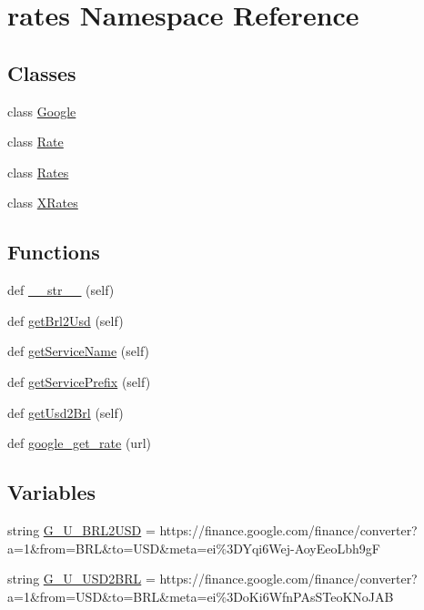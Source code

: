 \hypertarget{namespacerates}{}\section{rates Namespace Reference}
\label{namespacerates}
\subsection*{Classes}
\begin{DoxyCompactItemize}
\item 
class \hyperlink{classrates_1_1_google}{Google}
\item 
class \hyperlink{classrates_1_1_rate}{Rate}
\item 
class \hyperlink{classrates_1_1_rates}{Rates}
\item 
class \hyperlink{classrates_1_1_x_rates}{X\+Rates}
\end{DoxyCompactItemize}
\subsection*{Functions}
\begin{DoxyCompactItemize}
\item 
def \hyperlink{namespacerates_a2f1a70c33ee9e255938e4c19fd207264}{\+\_\+\+\_\+str\+\_\+\+\_\+} (self)
\item 
def \hyperlink{namespacerates_a083f2cdcd71554d301bcbfb0779ffa49}{get\+Brl2\+Usd} (self)
\item 
def \hyperlink{namespacerates_a5dd7b6601bc66e313c26984e32f1e290}{get\+Service\+Name} (self)
\item 
def \hyperlink{namespacerates_aafc179b32863137b88c74dd0ee2576bd}{get\+Service\+Prefix} (self)
\item 
def \hyperlink{namespacerates_ae4c7203ef8a919f9cf522581ca00b08a}{get\+Usd2\+Brl} (self)
\item 
def \hyperlink{namespacerates_a2819015de60b5745e06ed3d266d26d6b}{google\+\_\+get\+\_\+rate} (url)
\end{DoxyCompactItemize}
\subsection*{Variables}
\begin{DoxyCompactItemize}
\item 
string \hyperlink{namespacerates_a4b516d1323011d86ff6aef5851ec8fcf}{G\+\_\+\+U\+\_\+\+B\+R\+L2\+U\+SD} = \textquotesingle{}https\+://finance.\+google.\+com/finance/converter?a=1\&from=B\+RL\&to=U\+SD\&meta=ei\%3\+D\+Yqi6\+Wej-\/\+Aoy\+Eeo\+Lbh9g\+F\textquotesingle{}
\item 
string \hyperlink{namespacerates_a0ba47a320577d69e1955c13a384dd662}{G\+\_\+\+U\+\_\+\+U\+S\+D2\+B\+RL} = \textquotesingle{}https\+://finance.\+google.\+com/finance/converter?a=1\&from=U\+SD\&to=B\+RL\&meta=ei\%3\+Do\+Ki6\+Wfn\+P\+As\+S\+Teo\+K\+No\+J\+A\+B\textquotesingle{}
\end{DoxyCompactItemize}


